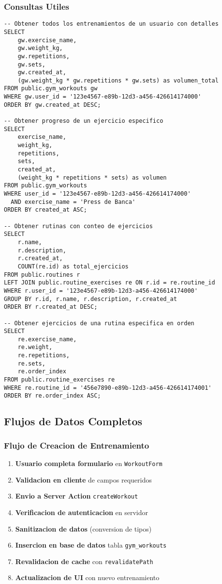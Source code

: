 \documentclass[12pt,a4paper]{article}
\begin{document}
\subsubsection{Consultas Utiles}

\begin{lstlisting}[style=sqlstyle, caption=Consultas utiles para analisis]
-- Obtener todos los entrenamientos de un usuario con detalles
SELECT 
    gw.exercise_name,
    gw.weight_kg,
    gw.repetitions,
    gw.sets,
    gw.created_at,
    (gw.weight_kg * gw.repetitions * gw.sets) as volumen_total
FROM public.gym_workouts gw
WHERE gw.user_id = '123e4567-e89b-12d3-a456-426614174000'
ORDER BY gw.created_at DESC;

-- Obtener progreso de un ejercicio especifico
SELECT 
    exercise_name,
    weight_kg,
    repetitions,
    sets,
    created_at,
    (weight_kg * repetitions * sets) as volumen
FROM public.gym_workouts
WHERE user_id = '123e4567-e89b-12d3-a456-426614174000'
  AND exercise_name = 'Press de Banca'
ORDER BY created_at ASC;

-- Obtener rutinas con conteo de ejercicios
SELECT 
    r.name,
    r.description,
    r.created_at,
    COUNT(re.id) as total_ejercicios
FROM public.routines r
LEFT JOIN public.routine_exercises re ON r.id = re.routine_id
WHERE r.user_id = '123e4567-e89b-12d3-a456-426614174000'
GROUP BY r.id, r.name, r.description, r.created_at
ORDER BY r.created_at DESC;

-- Obtener ejercicios de una rutina especifica en orden
SELECT 
    re.exercise_name,
    re.weight,
    re.repetitions,
    re.sets,
    re.order_index
FROM public.routine_exercises re
WHERE re.routine_id = '456e7890-e89b-12d3-a456-426614174001'
ORDER BY re.order_index ASC;
\end{lstlisting}

\subsection{Flujos de Datos Completos}

\subsubsection{Flujo de Creacion de Entrenamiento}

\begin{enumerate}
    \item \textbf{Usuario completa formulario} en \texttt{WorkoutForm}
    \item \textbf{Validacion en cliente} de campos requeridos
    \item \textbf{Envio a Server Action} \texttt{createWorkout}
    \item \textbf{Verificacion de autenticacion} en servidor
    \item \textbf{Sanitizacion de datos} (conversion de tipos)
    \item \textbf{Insercion en base de datos} tabla \texttt{gym\_workouts}
    \item \textbf{Revalidacion de cache} con \texttt{revalidatePath}
    \item \textbf{Actualizacion de UI} con nuevo entrenamiento
\end{enumerate}
\end{document}
